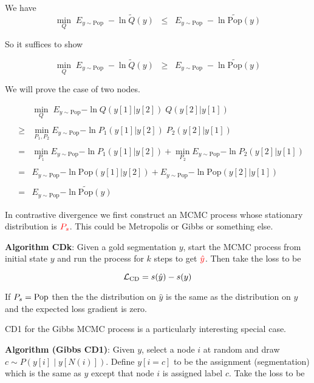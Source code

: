 {
We have
$$\min_{Q} \;E_{y \sim \mathrm{Pop}}\;-\ln \tilde{Q}(y) \;\;\leq \;\; E_{y \sim \mathrm{Pop}}\;-\ln \widetilde{\mathrm{Pop}}(y)$$

\vfill
So it suffices to show

$$\min_{Q} \;E_{y \sim \mathrm{Pop}}\;-\ln \tilde{Q}(y) \;\;\geq \;\; E_{y \sim \mathrm{Pop}}\;-\ln \widetilde{\mathrm{Pop}}(y)$$


We will prove the case of two nodes.

\vfill
\begin{eqnarray*}
  & & \min_Q \;E_{y\sim \mathrm{Pop}}{-\ln Q(y[1]|y[2])\;Q(y[2]|y[1])} \\
  \\
  & \geq & \min_{P_1,P_2} E_{y \sim \mathrm{Pop}}{-\ln P_1(y[1]|y[2])\;P_2(y[2]|y[1])} \\
  \\
  & = & \min_{P_1} E_{y \sim \mathrm{Pop}}{-\ln P_1(y[1]|y[2])} + \min_{P_2} E_{y \sim \mathrm{Pop}}{-\ln P_2(y[2]|y[1])} \\
  \\
  & = & E_{y \sim \mathrm{Pop}}{-\ln \mathrm{Pop}(y[1]|y[2])} + E_{y \sim \mathrm{Pop}}{-\ln \mathrm{Pop}(y[2]|y[1])} \\
  \\
  & = & E_{y \sim \mathrm{Pop}}{-\ln \widetilde{\mathrm{Pop}}(y)}
\end{eqnarray*}


In contrastive divergence we first construct an MCMC process whose stationary distribution is ${\color{red} P_s}$.  This could be
Metropolis or Gibbs or something else.

\vfill
{\bf Algorithm CDk}: Given a gold segmentation $y$, start the MCMC process from initial state $y$ and run the process for $k$ steps
to get ${\color{red} \hat{y}}$.  Then take the loss to be

\vfill
{\color{red} $${\cal L}_{\mathrm{CD}}  = s(\hat{y}) - s(y)$$}

If $P_s = \mathrm{Pop}$ then the the distribution on $\hat{y}$ is the same as the distribution on $y$ and the
expected loss gradient is zero.


CD1 for the Gibbs MCMC process is a particularly interesting special case.

\vfill
{\bf Algorithm (Gibbs CD1)}: Given $y$, select a node $i$ at random and draw {\color{red} $c \sim P(y[i]\;| \;y[N(i)])$}. Define {\color{red} $y[i=c]$}
to be the assignment (segmentation) which is the same as $y$ except that node $i$ is assigned label $c$.  Take the loss to be

}
